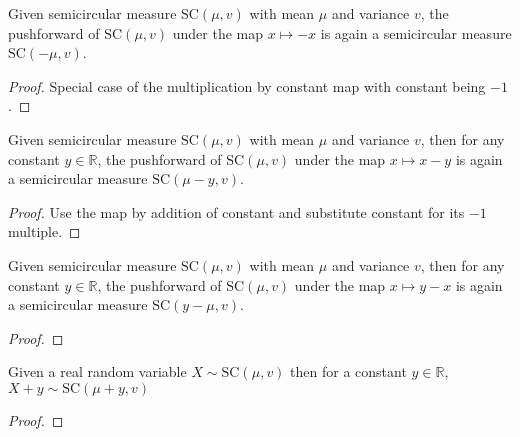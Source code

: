 \begin{lemma}\label{lem:semicircleReal_map_neg}
  \mathlibok
  Given semicircular measure $\mathrm{SC}(\mu, v)$ with mean $\mu$ and variance $v$, the pushforward
  of $\mathrm{SC}(\mu, v)$ under the map $x \mapsto -x$ is again a semicircular measure $\mathrm{SC}(- \mu, v)$. 
  \begin{proof}
     Special case of the multiplication by constant map with constant being $-1$.
  \end{proof}
\end{lemma}



\begin{lemma}\label{lem:semicircleReal_map_sub_const}
  \mathlibok
  Given semicircular measure $\mathrm{SC}(\mu, v)$ with mean $\mu$ and variance $v$, then for any constant $y \in \mathbb{R}$, the pushforward
  of $\mathrm{SC}(\mu, v)$ under the map $x \mapsto x - y$ is again a semicircular measure $\mathrm{SC}( \mu - y, v)$. 
  \begin{proof}
   Use the map by addition of constant and substitute constant for its $-1$ multiple.
  \end{proof}
\end{lemma}


\begin{lemma}\label{lem:semicircleReal_map_const_sub}
  \mathlibok
   Given semicircular measure $\mathrm{SC}(\mu, v)$ with mean $\mu$ and variance $v$, then for any constant $y \in \mathbb{R}$, the pushforward
  of $\mathrm{SC}(\mu, v)$ under the map $x \mapsto y - x$ is again a semicircular measure $\mathrm{SC}(y - \mu, v)$. 
  \begin{proof}

  \end{proof}
\end{lemma}




\begin{lemma}\label{lem:semicircleReal_add_const}
  \mathlibok
  Given a real random variable $X \sim \mathrm{SC}(\mu, v)$
  then for a constant $y \in \mathbb{R}$, $X + y \sim \mathrm{SC}(\mu + y, v)$
  \begin{proof}
  \end{proof}
\end{lemma}


